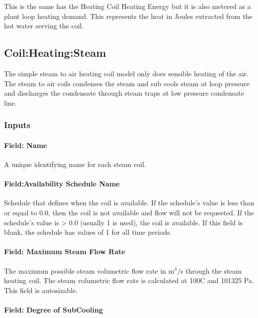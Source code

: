 This is the same has the Heating Coil Heating Energy but it is also metered as a plant loop heating demand. This represents the heat in Joules extracted from the hot water serving the coil.

\subsection{Coil:Heating:Steam}\label{coilheatingsteam}

The simple steam to air heating coil model only does sensible heating of the air. The steam to air coils condenses the steam and sub cools steam at loop pressure and discharges the condensate through steam traps at low pressure condensate line.

\subsubsection{Inputs}\label{inputs-2-019}

\paragraph{Field: Name}\label{field-name-2-018}

A unique identifying name for each steam coil.

\paragraph{Field:Availability Schedule Name}\label{fieldavailability-schedule-name-2-000}

Schedule that defines when the coil is available. If the schedule's value is less than or equal to 0.0, then the coil is not available and flow will not be requested. If the schedule's value is \textgreater{} 0.0 (usually 1 is used), the coil is available. If this field is blank, the schedule has values of 1 for all time periods.

\paragraph{Field: Maximum Steam Flow Rate}\label{field-maximum-steam-flow-rate}

The maximum possible steam volumetric flow rate in m\(^{3}\)/s through the steam heating coil. The steam volumetric flow rate is calculated at 100C and 101325 Pa. This field is autosizable.

\paragraph{Field: Degree of SubCooling}\label{field-degree-of-subcooling}

